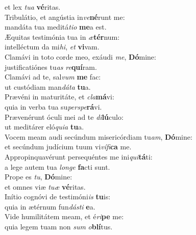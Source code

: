 \evenverse et lex \textit{tu}\textit{a} \textbf{vé}ritas.\\
\oddverse Tribulátio, et angústia in\textit{ve}\textbf{né}runt me:~\*\\
\oddverse mandáta tua meditá\textit{ti}\textit{o} \textbf{me}a est.\\
\evenverse Æquitas testimónia tua in \textit{æ}\textbf{tér}num:~\*\\
\evenverse intelléctum da mi\textit{hi}, \textit{et} \textbf{vi}vam.\\
\oddverse Clamávi in toto corde meo, exáudi \textit{me}, \textbf{Dó}mine:~\*\\
\oddverse justificatiónes tu\textit{as} \textit{re}\textbf{quí}ram.\\
\evenverse Clamávi ad te, sal\textit{vum} \textbf{me} fac:~\*\\
\evenverse ut custódiam man\textit{dá}\textit{ta} \textbf{tu}a.\\
\oddverse Prævéni in maturitáte, et \textit{cla}\textbf{má}vi:~\*\\
\oddverse quia in verba tua su\textit{per}\textit{spe}\textbf{rá}vi.\\
\evenverse Prævenérunt óculi mei ad te \textit{di}\textbf{lú}culo:~\*\\
\evenverse ut meditárer eló\textit{qui}\textit{a} \textbf{tu}a.\\
\oddverse Vocem meam audi secúndum misericórdiam tu\textit{am}, \textbf{Dó}mine:~\*\\
\oddverse et secúndum judícium tuum vi\textit{ví}\textit{fi}\textbf{ca} me.\\
\evenverse Appropinquavérunt persequéntes me ini\textit{qui}\textbf{tá}ti:~\*\\
\evenverse a lege autem tua \textit{lon}\textit{ge} \textbf{fa}cti sunt.\\
\oddverse Prope es \textit{tu}, \textbf{Dó}mine:~\*\\
\oddverse et omnes viæ \textit{tu}\textit{æ} \textbf{vé}ritas.\\
\evenverse Inítio cognóvi de testimóni\textit{is} \textbf{tu}is:~\*\\
\evenverse quia in ætérnum fun\textit{dá}\textit{sti} \textbf{e}a.\\
\oddverse Vide humilitátem meam, et é\textit{ri}\textbf{pe} me:~\*\\
\oddverse quia legem tuam non \textit{sum} \textit{o}\textbf{blí}tus.\\
